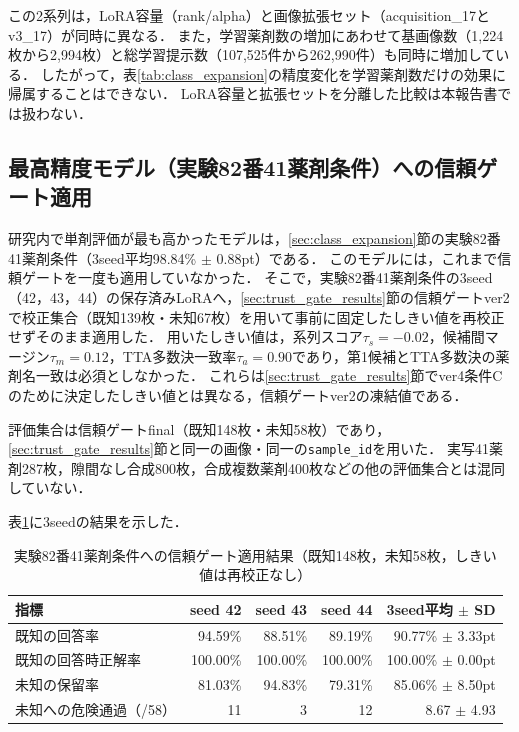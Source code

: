 \documentclass[uplatex,dvipdfmx]{jsarticle}
\begin{document}
この2系列は，LoRA容量（rank/alpha）と画像拡張セット（acquisition\_17とv3\_17）が同時に異なる．
また，学習薬剤数の増加にあわせて基画像数（1,224枚から2,994枚）と総学習提示数（107,525件から262,990件）も同時に増加している．
したがって，表\ref{tab:class_expansion}の精度変化を学習薬剤数だけの効果に帰属することはできない．
LoRA容量と拡張セットを分離した比較は本報告書では扱わない．

\subsection{最高精度モデル（実験82番41薬剤条件）への信頼ゲート適用}\label{sec:gate_exp82}

研究内で単剤評価が最も高かったモデルは，\ref{sec:class_expansion}節の実験82番41薬剤条件（3seed平均98.84\% $\pm$ 0.88pt）である．
このモデルには，これまで信頼ゲートを一度も適用していなかった．
そこで，実験82番41薬剤条件の3seed（42，43，44）の保存済みLoRAへ，\ref{sec:trust_gate_results}節の信頼ゲートver2で校正集合（既知139枚・未知67枚）を用いて事前に固定したしきい値を再校正せずそのまま適用した．
用いたしきい値は，系列スコア$\tau_s=-0.02$，候補間マージン$\tau_m=0.12$，TTA多数決一致率$\tau_a=0.90$であり，第1候補とTTA多数決の薬剤名一致は必須としなかった．
これらは\ref{sec:trust_gate_results}節でver4条件Cのために決定したしきい値とは異なる，信頼ゲートver2の凍結値である．

評価集合は信頼ゲートfinal（既知148枚・未知58枚）であり，\ref{sec:trust_gate_results}節と同一の画像・同一の\texttt{sample\_id}を用いた．
実写41薬剤287枚，隙間なし合成800枚，合成複数薬剤400枚などの他の評価集合とは混同していない．

表\ref{tab:gate_exp82}に3seedの結果を示した．

\begin{table}[htbp]
  \centering
  \caption{実験82番41薬剤条件への信頼ゲート適用結果（既知148枚，未知58枚，しきい値は再校正なし）}
  \label{tab:gate_exp82}
  \small
  \setlength{\tabcolsep}{3.5pt}
  \begin{tabular}{|l|r|r|r|r|}
    \hline
    指標 & seed 42 & seed 43 & seed 44 & 3seed平均 $\pm$ SD \\ \hline
    既知の回答率 & 94.59\% & 88.51\% & 89.19\% & 90.77\% $\pm$ 3.33pt \\ \hline
    既知の回答時正解率 & 100.00\% & 100.00\% & 100.00\% & 100.00\% $\pm$ 0.00pt \\ \hline
    未知の保留率 & 81.03\% & 94.83\% & 79.31\% & 85.06\% $\pm$ 8.50pt \\ \hline
    未知への危険通過（/58） & 11 & 3 & 12 & 8.67 $\pm$ 4.93 \\ \hline
  \end{tabular}
\end{table}
\end{document}
